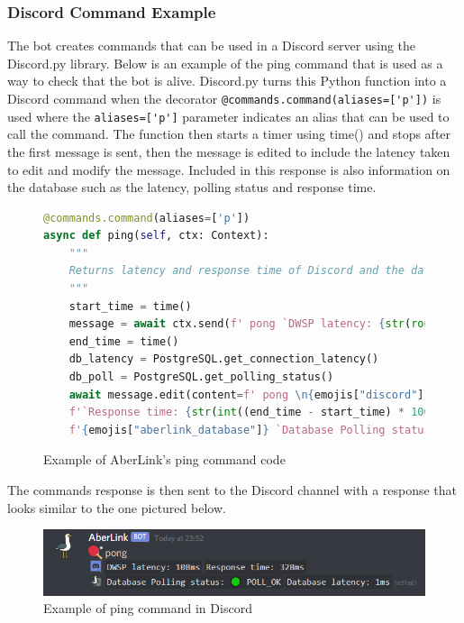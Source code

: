 \subsubsection{Discord Command Example}

The bot creates commands that can be used in a Discord server using the Discord.py \cite{discord.py} library. Below is an example of the ping command that is used as a way to check that the bot is alive. Discord.py turns this Python function into a Discord command when the decorator \verb|@commands.command(aliases=['p'])| is used where the \verb|aliases=['p']| parameter indicates an alias that can be used to call the command. The function then starts a timer using time() and stops after the first message is sent, then the message is edited to include the latency taken to edit and modify the message. Included in this response is also information on the database such as the latency, polling status and response time.

\begin{figure}[H]
\begin{lstlisting}[language=Python]
@commands.command(aliases=['p'])
async def ping(self, ctx: Context):
	"""
	Returns latency and response time of Discord and the database
	"""
	start_time = time()
	message = await ctx.send(f' pong `DWSP latency: {str(round(ctx.bot.latency * 1000))}ms`')
	end_time = time()
	db_latency = PostgreSQL.get_connection_latency()
	db_poll = PostgreSQL.get_polling_status()
	await message.edit(content=f' pong \n{emojis["discord"]} `DWSP latency: {str(round(ctx.bot.latency * 1000))}ms` ' +
    f'`Response time: {str(int((end_time - start_time) * 1000))}ms` \n' +
    f'{emojis["aberlink_database"]} `Database Polling status: {db_poll}` `Database latency: {db_latency}ms`')

\end{lstlisting}
\caption{Example of AberLink's ping command code}
\label{fig:discord-command-ping-code}
\end{figure}

The commands response is then sent to the Discord channel with a response that looks similar to the one pictured below.

\begin{figure}[H]
	\centering
	\includegraphics[width=1\linewidth]{Figures/discord-ping-command.png}
	\caption{Example of ping command in Discord}
	\label{fig:discord-command-ping}
\end{figure}

